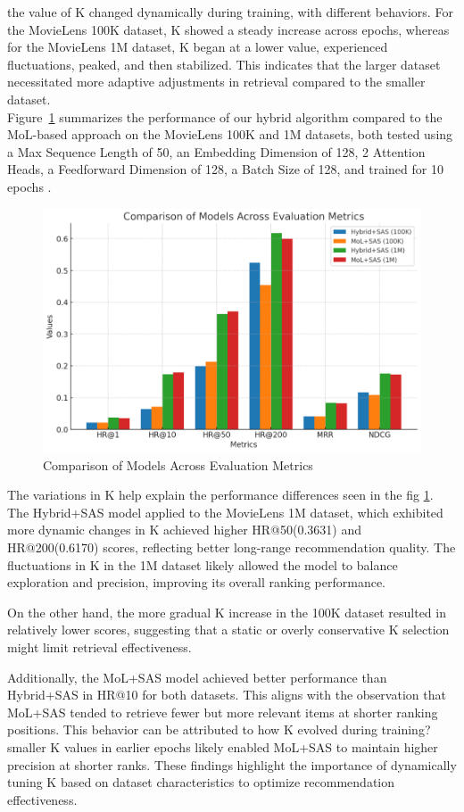 \documentclass[Afour,sageh,times]{sagej}
\begin{document}
the value of K changed dynamically during training, with different behaviors. For the MovieLens 100K dataset, K showed a steady increase across epochs, whereas for the MovieLens 1M dataset, K began at a lower value, experienced fluctuations, peaked, and then stabilized. This indicates that the larger dataset necessitated more adaptive adjustments in retrieval compared to the smaller dataset.\\
Figure~\ref{histo_p} summarizes the performance of our hybrid algorithm compared to the MoL-based approach on the MovieLens 100K and 1M datasets, both tested using a Max Sequence Length of 50, an Embedding Dimension of 128, 2 Attention Heads, a Feedforward Dimension of 128, a Batch Size of 128, and trained for 10 epochs . \\
\begin{figure}[ht]
	\centering
	\includegraphics[width=0.7\linewidth]{HISTOGRAM.png}
	\caption{Comparison of Models Across Evaluation Metrics}\label{histo_p}
\end{figure}
The variations in K help explain the performance differences seen in the fig \ref{histo_p}. The Hybrid+SAS model applied to the MovieLens 1M dataset, which exhibited more dynamic changes in K achieved higher HR@50(0.3631) and HR@200(0.6170) scores, reflecting better long-range recommendation quality. The fluctuations in K in the 1M dataset likely allowed the model to balance exploration and precision, improving its overall ranking performance.

On the other hand, the more gradual K increase in the 100K dataset resulted in relatively lower scores, suggesting that a static or overly conservative 
K selection might limit retrieval effectiveness.

Additionally, the MoL+SAS model achieved better performance than Hybrid+SAS in HR@10 for both datasets. This aligns with the observation that MoL+SAS tended to retrieve fewer but more relevant items at shorter ranking positions. This behavior can be attributed to how K evolved during training?smaller K values in earlier epochs likely enabled MoL+SAS to maintain higher precision at shorter ranks.
These findings highlight the importance of dynamically tuning K based on dataset characteristics to optimize recommendation effectiveness.
\end{document}
